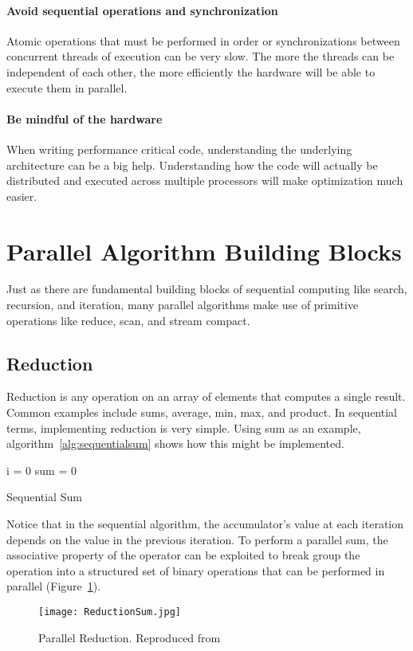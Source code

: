 \paragraph{Avoid sequential operations and synchronization}
Atomic operations that must be performed in order or synchronizations between concurrent threads of execution can be very slow. The more the threads can be independent of each other, the more efficiently the hardware will be able to execute them in parallel.
\paragraph{Be mindful of the hardware}
When writing performance critical code, understanding the underlying architecture can be a big help. Understanding how the code will actually be distributed and executed across multiple processors will make optimization much easier.

\section{Parallel Algorithm Building Blocks}
Just as there are fundamental building blocks of sequential computing like search, recursion, and iteration, many parallel algorithms make use of primitive operations like reduce, scan, and stream compact.
\subsection{Reduction}
Reduction is any operation on an array of elements that computes a single result. Common examples include sums, average, min, max, and product. In sequential terms, implementing reduction is very simple. Using sum as an example, algorithm~\ref{alg:sequentialsum} shows how this might be implemented.\\
\begin{algorithm}[!htpb]
\label{alg:sequentialsum}
 \singlespacing
 i = 0\;
 sum = 0\;
 \caption{Sequential Sum}
\end{algorithm}

Notice that in the sequential algorithm, the accumulator's value at each iteration depends on the value in the previous iteration. To perform a parallel sum, the associative property of the operator can be exploited to break group the operation into a structured set of binary operations that can be performed in parallel (Figure~\ref{fig:reductionsum}).
\begin{figure}[ht]
    \centering
    \texttt{[image: ReductionSum.jpg]}
    \caption{Parallel Reduction. Reproduced from\cite{nguyen2007gpu}}
    \label{fig:reductionsum}
\end{figure}

